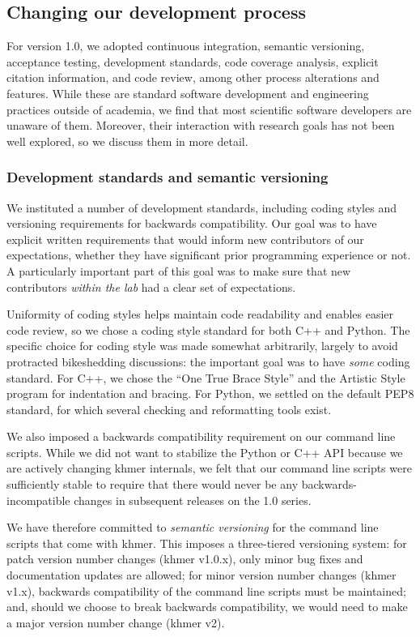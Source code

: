 \documentclass[12pt]{article}
\begin{document}
\subsection{Changing our development process}

For version 1.0, we adopted continuous integration, semantic
versioning, acceptance testing, development standards, code coverage
analysis, explicit citation information, and code review, among other
process alterations and features.  While these are standard software
development and engineering practices outside of academia, we find
that most scientific software developers are unaware of them.
Moreover, their interaction with research goals has not been well
explored, so we discuss them in more detail.

\subsubsection{Development standards and semantic versioning}

We instituted a number of development standards, including coding
styles and versioning requirements for backwards compatibility.  Our
goal was to have explicit written requirements that would inform new
contributors of our expectations, whether they have significant prior
programming experience or not.  A particularly important part of this
goal was to make sure that new contributors {\em within the lab} had
a clear set of expectations.

Uniformity of coding styles helps maintain code readability and
enables easier code review, so we chose a coding style standard for
both C++ and Python. The specific choice for coding style was made
somewhat arbitrarily, largely to avoid protracted bikeshedding
discussions: the important goal was to have {\em some} coding
standard. For C++, we chose the ``One True Brace Style'' and the
Artistic Style program for indentation and bracing.  For Python, we
settled on the default PEP8 standard, for which several checking and
reformatting tools exist.

We also imposed a backwards compatibility requirement on our command
line scripts.  While we did not want to stabilize the Python or C++
API because we are actively changing khmer internals, we felt that our
command line scripts were sufficiently stable to require that there would never
be any backwards-incompatible changes in subsequent releases on the 1.0 series.

We have therefore committed to {\em semantic versioning}\cite{semver} for the
command line scripts that come with khmer.  This imposes a
three-tiered versioning system: for patch version number changes
(khmer v1.0.x), only minor bug fixes and documentation updates are
allowed; for minor version number changes (khmer v1.x), backwards
compatibility of the command line scripts must be maintained; and,
should we choose to break backwards compatibility, we would need to
make a major version number change (khmer v2).
\end{document}
